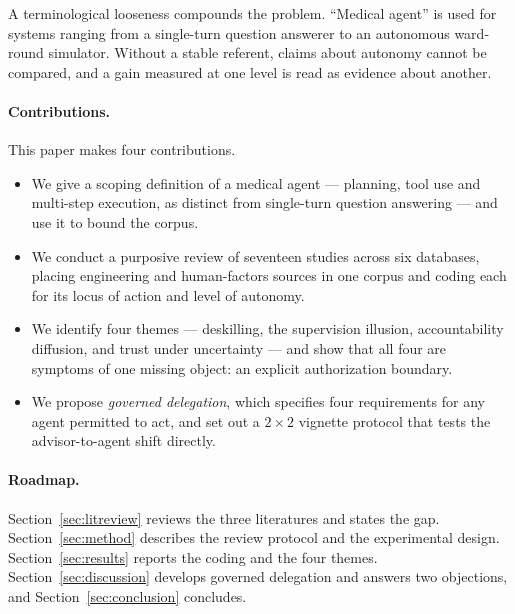 A terminological looseness compounds the problem. ``Medical agent'' is used for systems ranging from a single-turn question answerer to an autonomous ward-round simulator. Without a stable referent, claims about autonomy cannot be compared, and a gain measured at one level is read as evidence about another.

\paragraph{Contributions.}
This paper makes four contributions.
\begin{itemize}
  \item We give a scoping definition of a medical agent --- planning, tool use and multi-step execution, as distinct from single-turn question answering --- and use it to bound the corpus.
  \item We conduct a purposive review of seventeen studies across six databases, placing engineering and human-factors sources in one corpus and coding each for its locus of action and level of autonomy.
  \item We identify four themes --- deskilling, the supervision illusion, accountability diffusion, and trust under uncertainty --- and show that all four are symptoms of one missing object: an explicit authorization boundary.
  \item We propose \emph{governed delegation}, which specifies four requirements for any agent permitted to act, and set out a $2\times2$ vignette protocol that tests the advisor-to-agent shift directly.
\end{itemize}

\paragraph{Roadmap.}
Section~\ref{sec:litreview} reviews the three literatures and states the gap. Section~\ref{sec:method} describes the review protocol and the experimental design. Section~\ref{sec:results} reports the coding and the four themes. Section~\ref{sec:discussion} develops governed delegation and answers two objections, and Section~\ref{sec:conclusion} concludes.
